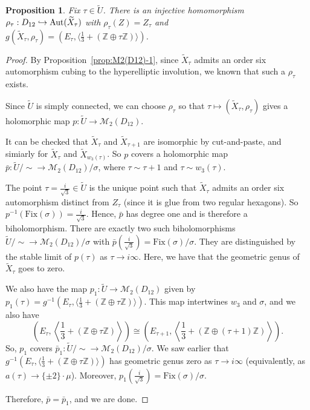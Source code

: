 \documentclass[a4paper,11pt]{amsart}
\numberwithin{equation}{section}
\numberwithin{figure}{section}
\numberwithin{table}{section}
\newtheorem{proposition}[theorem]{Proposition}
\newcommand{\Z}{\mathbb{Z}}
\DeclareMathOperator{\Aut}{{\rm{Aut}}}
\begin{document}
\begin{proposition}
    Fix $\tau\in\widetilde{U}$. There is an injective homomorphism $\rho_{\tau}:D_{12}\hookrightarrow\Aut(\widetilde{X}_{\tau})$ with $\rho_{\tau}(Z) = Z_{\tau}$ and $g(\widetilde{X}_{\tau},\rho_{\tau}) = (E_{\tau},\langle\frac{1}{3}+(\Z\oplus\tau\Z)\rangle)$.
\end{proposition}

\begin{proof}
    By Proposition~\ref{prop:M2(D12)-1}, since $\widetilde{X}_{\tau}$ admits an order six automorphism cubing to the hyperelliptic involution, we known that such a $\rho_{\tau}$ exists.
    
    Since $\widetilde{U}$ is simply connected, we can choose $\rho_{\tau}$ so that $\tau\mapsto(\widetilde{X}_{\tau},\rho_{\tau})$ gives a holomorphic map $p:\widetilde{U}\to\mathcal{M}_{2}(D_{12})$.

    It can be checked that $\widetilde{X}_{\tau}$ and $\widetilde{X}_{\tau+1}$ are isomorphic by cut-and-paste, and simiarly for $\widetilde{X}_{\tau}$ and $\widetilde{X}_{w_{3}(\tau)}$. So $p$ covers a holomorphic map $\bar{p}:\widetilde{U}/{\sim}\to\mathcal{M}_{2}(D_{12})/\sigma$, where $\tau\sim\tau+1$ and $\tau\sim w_{3}(\tau)$.

    The point $\tau = \frac{i}{\sqrt{3}}\in\widetilde{U}$ is the unique point such that $\widetilde{X}_{\tau}$ admits an order six automorphism distinct from $Z_{\tau}$ (since it is glue from two regular hexagons). So $p^{-1}(\text{Fix}(\sigma)) = \frac{i}{\sqrt{3}}$. Hence, $\bar{p}$ has degree one and is therefore a biholomorphism. There are exactly two such biholomorphisms $\widetilde{U}/{\sim}\to\mathcal{M}_{2}(D_{12})/\sigma$ with $\bar{p}(\frac{i}{\sqrt{3}}) = \text{Fix}(\sigma)/\sigma$. They are distinguished by the stable limit of $p(\tau)$ as $\tau\to i\infty$. Here, we have that the geometric genus of $\widetilde{X}_{\tau}$ goes to zero.

    We also have the map $p_{1}:\widetilde{U}\to\mathcal{M}_{2}(D_{12})$ given by $p_{1}(\tau) = g^{-1}(E_{\tau},\langle\frac{1}{3}+(\Z\oplus\tau\Z)\rangle)$. This map intertwines $w_{3}$ and $\sigma$, and we also have
    $$\left(E_{\tau},\left\langle\frac{1}{3}+(\Z\oplus\tau\Z)\right\rangle\right)\cong\left(E_{\tau+1},\left\langle\frac{1}{3}+(\Z\oplus(\tau+1)\Z)\right\rangle\right).$$
    So, $p_{1}$ covers $\bar{p}_{1}:\widetilde{U}/{\sim}\to\mathcal{M}_{2}(D_{12})/\sigma$. We saw earlier that $g^{-1}(E_{\tau},\langle\frac{1}{3}+(\Z\oplus\tau\Z)\rangle)$ has geometric genus zero as $\tau\to i\infty$ (equivalently, as $a(\tau)\to\{\pm 2\}\cdot\mu$). Moreover, $p_{1}(\frac{i}{\sqrt{3}}) = \text{Fix}(\sigma)/\sigma$.

    Therefore, $\bar{p} = \bar{p}_{1}$, and we are done.
\end{proof}
\end{document}
